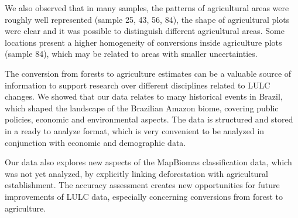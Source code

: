 \documentclass[essd, manuscript]{copernicus}
\begin{document}
We also observed that in many samples, the patterns of agricultural areas were roughly well represented (sample 25, 43, 56, 84), the shape of agricultural plots were clear and it was possible to distinguish different agricultural areas.
Some locations present a higher homogeneity of conversions inside agriculture plots (sample 84), which may be related to areas with smaller uncertainties.

\conclusions[Conclusions]

The conversion from forests to agriculture estimates can be a valuable source of information to support research over different disciplines related to LULC changes.
We showed that our data relates to many historical events in Brazil, which shaped the landscape of the Brazilian Amazon biome, covering public policies, economic and environmental aspects.
The data is structured and stored in a ready to analyze format, which is very convenient to be analyzed in conjunction with economic and demographic data.

Our data also explores new aspects of the MapBiomas classification data, which was not yet analyzed, by explicitly linking deforestation with agricultural establishment.
The accuracy assessment creates new opportunities for future improvements of LULC data, especially concerning conversions from forest to agriculture.
















\end{document}
